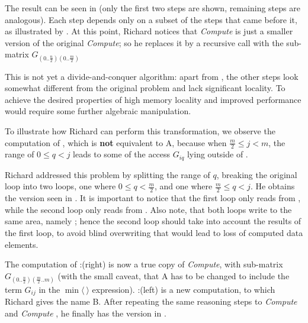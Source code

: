 The result can be seen in  (only the first two steps are shown, remaining steps are analogous).
Each step depends only on a subset of the steps that came before it, 
as illustrated by . 
At this point, Richard notices that {\it Compute } is just a smaller version of
the original {\it Compute}; so he replaces it by a recursive call with
the sub-matrix $G_{(0..\frac{n}{2})(0..\frac{m}{2})}$

This is not yet a divide-and-conquer algorithm: 
apart from , the other steps
look somewhat different from the original problem and lack significant locality. 
To achieve the desired properties of high memory locality and improved
performance would require some further algebraic manipulation.

To illustrate how Richard can perform this transformation, 
we observe the computation of , which is {\bf not} equivalent to
A, 
because when $\frac{m}{2} \leq j < m$, the range of $0\leq q < j$ leads to
some of the access $G_{iq}$ lying outside of .

Richard addressed this problem by splitting the range of $q$, breaking
the original loop into two loops, one where $0\leq q < \frac{m}{2}$,
and one where $\frac{m}{2}\leq q < j$. He obtains the version seen in
. It is important to notice that the first
loop only reads from , while the second loop only reads from .
Also note, that both loops write to the same area, namely ; hence
the second loop should take into account the results of the first loop,
to avoid blind overwriting that would lead to loss of computed data elements.

The computation of :(right) is now a true copy of {\it Compute},
with sub-matrix $G_{(0..\frac{n}{2})(\frac{m}{2}..m)}$ (with the small caveat,
that A has to be changed to include the term $G_{ij}$ in the $\min\langle~\rangle$ expression).
:(left) is a new computation, to which Richard gives the name B. After repeating
the same reasoning steps to {\it Compute } and {\it Compute },
he finally has the version in .

